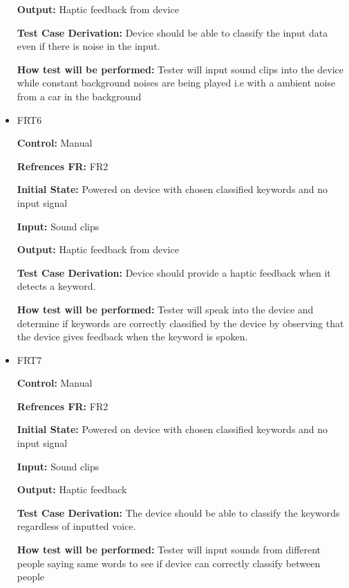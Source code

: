 \documentclass[12pt, titlepage]{article}
\begin{document}
\begin{itemize}
\textbf{Output:} Haptic feedback from device

\textbf{Test Case Derivation:} Device should be able to classify the input data even if there is noise in the input.
					
\textbf{How test will be performed:} Tester will input sound clips into the device while constant background noises are being played i.e with a ambient noise from a car in the background


\item{FRT6}

\textbf{Control:} Manual

\textbf{Refrences FR:} FR2 					

\textbf{Initial State:} Powered on device with chosen classified keywords and no input signal 
					
\textbf{Input:} Sound clips
					
\textbf{Output:} Haptic feedback from device

\textbf{Test Case Derivation:} Device should provide a haptic feedback when it detects a keyword.
					
\textbf{How test will be performed:} Tester will speak into the device and determine if keywords are correctly classified by the device by observing that the device gives feedback when the keyword is spoken.


\item{FRT7}

\textbf{Control:} Manual

\textbf{Refrences FR:} FR2 					

\textbf{Initial State:} Powered on device with chosen classified keywords and no input signal 
					
\textbf{Input:} Sound clips
					
\textbf{Output:} Haptic feedback

\textbf{Test Case Derivation:} The device should be able to classify the keywords regardless of inputted voice.
					
\textbf{How test will be performed:} Tester will input sounds from different people saying same words to see if device can correctly classify between people 



\end{itemize}
\end{document}
